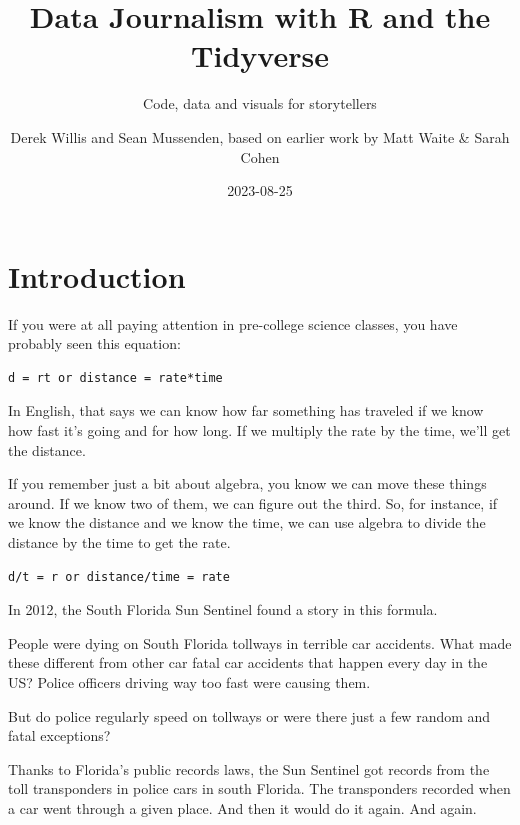 \documentclass[
  letterpaper,
  DIV=11,
  numbers=noendperiod]{scrreprt}
\title{Data Journalism with R and the Tidyverse}
\subtitle{Code, data and visuals for storytellers}
\author{Derek Willis and Sean Mussenden, based on earlier work by Matt
Waite \& Sarah Cohen}
\date{2023-08-25}
\renewcommand*\contentsname{Table of contents}
\newcommand\contentsname{Table of contents}
\begin{document}
\maketitle
\ifdefined\Shaded\renewenvironment{Shaded}{\begin{tcolorbox}[enhanced, sharp corners, frame hidden, interior hidden, borderline west={3pt}{0pt}{shadecolor}, breakable, boxrule=0pt]}{\end{tcolorbox}}\fi

\renewcommand*\contentsname{Table of contents}
{
\hypersetup{linkcolor=}
\setcounter{tocdepth}{2}
\tableofcontents
}

\hypertarget{introduction}{%
\chapter{Introduction}\label{introduction}}

If you were at all paying attention in pre-college science classes, you
have probably seen this equation:

\begin{verbatim}
d = rt or distance = rate*time
\end{verbatim}

In English, that says we can know how far something has traveled if we
know how fast it's going and for how long. If we multiply the rate by
the time, we'll get the distance.

If you remember just a bit about algebra, you know we can move these
things around. If we know two of them, we can figure out the third. So,
for instance, if we know the distance and we know the time, we can use
algebra to divide the distance by the time to get the rate.

\begin{verbatim}
d/t = r or distance/time = rate
\end{verbatim}

In 2012, the South Florida Sun Sentinel found a story in this formula.

People were dying on South Florida tollways in terrible car accidents.
What made these different from other car fatal car accidents that happen
every day in the US? Police officers driving way too fast were causing
them.

But do police regularly speed on tollways or were there just a few
random and fatal exceptions?

Thanks to Florida's public records laws, the Sun Sentinel got records
from the toll transponders in police cars in south Florida. The
transponders recorded when a car went through a given place. And then it
would do it again. And again.
\end{document}
